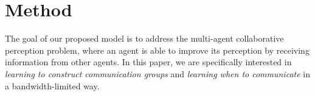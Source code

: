 \section{Method}

The goal of our proposed model is to address the multi-agent collaborative perception problem, where an agent is able to improve its perception by receiving information from other agents. In this paper, we are specifically interested in \textit{learning to construct communication groups} and \textit{learning when to communicate} in a bandwidth-limited way. 








